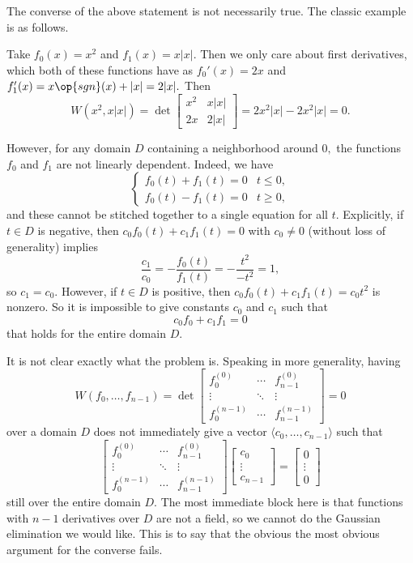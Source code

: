 The converse of the above statement is not necessarily true. The classic example is as follows.
\begin{example}
    Take $f_0(x)=x^2$ and $f_1(x)=x|x|.$ Then we only care about first derivatives, which both of these functions have as $f_0'(x)=2x$ and $f_1'(x)=x\op{sgn}(x)+|x|=2|x|.$ Then
    \[W\left(x^2,x|x|\right)=\det\begin{bmatrix}
        x^2 & x|x| \\
        2x & 2|x|
    \end{bmatrix}=2x^2|x|-2x^2|x|=0.\]
\end{example}
However, for any domain $D$ containing a neighborhood around $0,$ the functions $f_0$ and $f_1$ are not linearly dependent. Indeed, we have
\[\begin{cases}
    f_0(t) + f_1(t) = 0 & t\le0, \\
    f_0(t) - f_1(t) = 0 & t\ge0,
\end{cases}\]
and these cannot be stitched together to a single equation for all $t.$ Explicitly, if $t\in D$ is negative, then $c_0f_0(t)+c_1f_1(t)=0$ with $c_0\ne0$ (without loss of generality) implies
\[\frac{c_1}{c_0}=-\frac{f_0(t)}{f_1(t)}=-\frac{t^2}{-t^2}=1,\]
so $c_1=c_0.$ However, if $t\in D$ is positive, then $c_0f_0(t)+c_1f_1(t)=c_0t^2$ is nonzero. So it is impossible to give constants $c_0$ and $c_1$ such that
\[c_0f_0+c_1f_1=0\]
that holds for the entire domain $D.$

It is not clear exactly what the problem is. Speaking in more generality, having
\[W(f_0,\ldots,f_{n-1})=\det\begin{bmatrix}
    f_0^{(0)} & \cdots & f_{n-1}^{(0)}\\
    \vdots & \ddots & \vdots \\
    f_0^{(n-1)} & \cdots & f_{n-1}^{(n-1)}
\end{bmatrix}=0\]
over a domain $D$ does not immediately give a vector $\langle c_0,\ldots,c_{n-1}\rangle$ such that
\[\begin{bmatrix}
    f_0^{(0)} & \cdots & f_{n-1}^{(0)}\\
    \vdots & \ddots & \vdots \\
    f_0^{(n-1)} & \cdots & f_{n-1}^{(n-1)}
\end{bmatrix}\begin{bmatrix} c_0 \\ \vdots \\ c_{n-1} \end{bmatrix}=\begin{bmatrix} 0 \\ \vdots \\ 0\end{bmatrix}\]
still over the entire domain $D.$ The most immediate block here is that functions with $n-1$ derivatives over $D$ are not a field, so we cannot do the Gaussian elimination we would like. This is to say that the obvious the most obvious argument for the converse fails.

